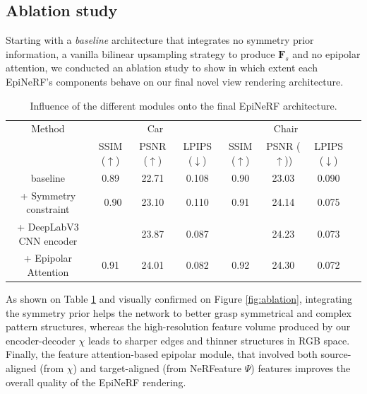\subsection{Ablation study}
Starting with a \textit{baseline} architecture that integrates no symmetry prior information, a vanilla bilinear upsampling strategy to produce $\mathbf{F}_{s}$ and no epipolar attention, we conducted an ablation study to show in which extent each EpiNeRF's components behave on our final novel view rendering architecture. 

\begin{table}[htp!]
\caption{Influence of the different modules onto the final EpiNeRF architecture.}
\label{tab:ablation}
\centering
\begin{adjustbox}{width=\textwidth}
\begin{tabular}[h]{c||ccccccc}
\hline
Method & \multicolumn{3}{c}{Car} & \multicolumn{3}{c}{Chair} \\
 &  SSIM ($\uparrow$) & PSNR ($\uparrow$) & LPIPS ($\downarrow$) & SSIM ($\uparrow$) & PSNR ($\uparrow$)) & LPIPS ($\downarrow$)\\[.5pt]
\hline
baseline & 0.89 & 22.71 & 0.108 & 0.90 & 23.03 & 0.090 \\[1.5pt]
\hline 
+ Symmetry constraint \citep{li2022symmnerf}  & \ 0.90 & 23.10  & 0.110 & 0.91 & 24.14 & 0.075 \\
+ DeepLabV3 CNN encoder  & \cellcolor{red!25}{0.91} & 23.87 & 0.087 & \cellcolor{red!25}{0.92} & 24.23 & 0.073 \\
+ Epipolar Attention  & \cellcolor{red!25}0.91 & \cellcolor{red!25}24.01 &\cellcolor{red!25}0.082 & \cellcolor{red!25}0.92 &  \cellcolor{red!25}24.30 &\cellcolor{red!25}0.072 \\
\end{tabular}
\end{adjustbox}

\end{table}

As shown on Table \ref{tab:ablation} and visually confirmed on Figure \ref{fig:ablation}, integrating the symmetry prior helps the network to better grasp symmetrical and complex pattern structures, whereas the high-resolution feature volume produced by our encoder-decoder $\chi$ leads to sharper edges and thinner structures in RGB space. Finally, the feature attention-based epipolar module, that involved both source-aligned (from $\chi$) and target-aligned (from NeRFeature $\Psi$) features improves the overall quality of the EpiNeRF rendering. 

